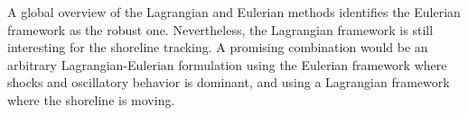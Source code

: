 A global overview of the Lagrangian and Eulerian methods identifies the Eulerian framework as the robust one. Nevertheless, the Lagrangian framework is still interesting for the shoreline tracking.
A promising combination would be an arbitrary Lagrangian-Eulerian formulation using the Eulerian framework where shocks and oscillatory behavior is dominant, and using a Lagrangian framework where the shoreline is moving.

